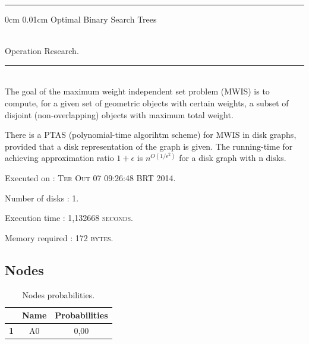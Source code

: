 \documentclass{article}
\makeatletter
\newcommand{\HRule}{\noindent\rule{\linewidth}{0.5mm}}
\renewcommand\section{\@startsection
  {section}{1}{0mm}%
  {0cm}%
  {0.01cm}%
  {\Huge\bfseries\color{black}}}%
\makeatother
\begin{document}
\HRule

\section{Optimal Binary Search Trees}

 \\[0.4cm]
{\LARGE Operation Research.}\\[0.4cm]
\HRule \\[0.5cm]
\indent The goal of the maximum weight independent set problem (MWIS) is to compute, for a given set of geometric objects with certain weights, a subset of disjoint (non-overlapping) objects with maximum total weight.

There is a PTAS (polynomial-time algorihtm scheme) for MWIS in disk graphs, provided that a disk representation of the graph is given. 
The running-time for achieving approximation ratio $1+\epsilon$ 
is $n^{O(1/\epsilon^{2})}$ for a disk graph with n disks.\\[0.5cm]
\begin{compactitem}
\item Executed on : \textsc{Ter Out 07 09:26:48 BRT 2014}. 
\item Number of disks : \textsc{1}. 
\item Execution time : \textsc{1,132668 seconds}. 
\item Memory required : \textsc{172 bytes}. 
\end{compactitem}

\subsection{Nodes}
\begin{table}[!ht]
\centering
\begin{tabular}{c||c|c|}
\cline{2-3}
 & \cellcolor{gray90}\textbf{Name} & \cellcolor{gray90}\textbf{Probabilities}  \\
\hline\hline
\multicolumn{1}{|c||}{\cellcolor{gray90}\textbf{1}} & A0 & 0,00 \\ \hline
\end{tabular}
\caption{Nodes probabilities.}
\end{table}

\newpage
\newpage
\tableofcontents
\newpage
\end{document}
